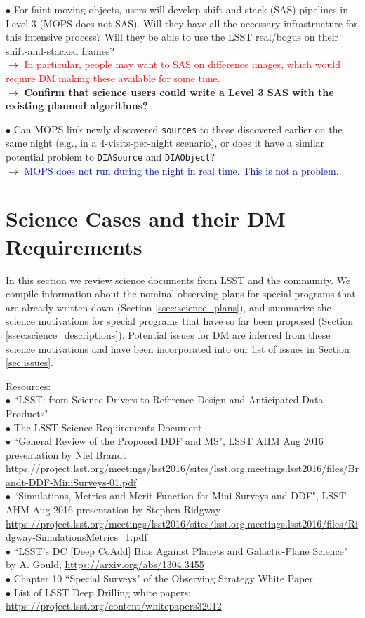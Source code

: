 \documentclass[DM,lsstdraft,toc]{lsstdoc}
\begin{document}
$\bullet$ For faint moving objects, users will develop shift-and-stack (SAS) pipelines in Level 3 (MOPS does not SAS). Will they have all the necessary infrastructure for this intensive process? Will they be able to use the LSST real/bogus on their shift-and-stacked frames? \\
$\rightarrow$ \textcolor{red}{In particular, people may want to SAS on difference images, which would require DM making these available for some time.} \\
$\rightarrow$ \textbf{Confirm that science users could write a Level 3 SAS with the existing planned algorithms?}

$\bullet$ Can MOPS link newly discovered {\tt sources} to those discovered earlier on the same night (e.g., in a 4-visits-per-night scenario), or does it have a similar potential problem to {\tt DIASource} and {\tt DIAObject}? \\
$\rightarrow$  \textcolor{blue}{MOPS does not run during the night in real time. This is not a problem.}.


\clearpage
\section{Science Cases and their DM Requirements} \label{sec:science}

In this section we review science documents from LSST and the community. We compile information about the nominal observing plans for special programs that are already written down (Section \ref{ssec:science_plans}), and summarize the science motivations for special programs that have so far been proposed (Section \ref{ssec:science_descriptions}). Potential issues for DM are inferred from these science motivations and have been incorporated into our list of issues in Section \ref{sec:issues}.

\noindent Resources: \\
$\bullet$ ``LSST: from Science Drivers to Reference Design and Anticipated Data Products" \cite{2008arXiv0805.2366I} \\
$\bullet$ The LSST Science Requirements Document \cite{LPM-17} \\
$\bullet$ ``General Review of the Proposed DDF and MS", LSST AHM Aug 2016 presentation by Niel Brandt \url{https://project.lsst.org/meetings/lsst2016/sites/lsst.org.meetings.lsst2016/files/Brandt-DDF-MiniSurveys-01.pdf} \\
$\bullet$ ``Simulations, Metrics and Merit Function for Mini-Surveys and DDF", LSST AHM Aug 2016 presentation by Stephen Ridgway \url{https://project.lsst.org/meetings/lsst2016/sites/lsst.org.meetings.lsst2016/files/Ridgway-SimulationsMetrics_1.pdf}\\
$\bullet$ ``LSST's DC [Deep CoAdd] Bias Against Planets and Galactic-Plane Science" by A. Gould, \cite{2013arXiv1304.3455G} \url{https://arxiv.org/abs/1304.3455} \\
$\bullet$ Chapter 10 ``Special Surveys" of the Observing Strategy White Paper \cite{OSWP} \\
$\bullet$ List of LSST Deep Drilling white papers: \url{https://project.lsst.org/content/whitepapers32012} \\
\end{document}
